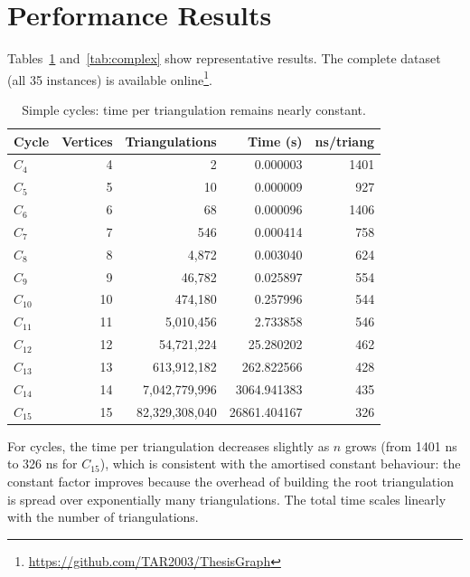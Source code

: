 \section{Performance Results}
\label{sec:results}

Tables~\ref{tab:cycles} and~\ref{tab:complex} show representative results. 
The complete dataset (all 35 instances) is available online\footnote{\url{https://github.com/TAR2003/ThesisGraph}}.

\begin{table}[htbp]
    \centering
    \caption{Simple cycles: time per triangulation remains nearly constant.}
    \label{tab:cycles}
    \begin{tabular}{|l|r|r|r|r|}
        \hline
        \textbf{Cycle} & \textbf{Vertices} & \textbf{Triangulations} & \textbf{Time (s)} & \textbf{ns/triang} \\
        \hline
        \(C_4\) & 4 & 2 & 0.000003 & 1401 \\
        \(C_5\) & 5 & 10 & 0.000009 & 927 \\
        \(C_6\) & 6 & 68 & 0.000096 & 1406 \\
        \(C_7\) & 7 & 546 & 0.000414 & 758 \\
        \(C_8\) & 8 & 4,872 & 0.003040 & 624 \\
        \(C_9\) & 9 & 46,782 & 0.025897 & 554 \\
        \(C_{10}\) & 10 & 474,180 & 0.257996 & 544 \\
        \(C_{11}\) & 11 & 5,010,456 & 2.733858 & 546 \\
        \(C_{12}\) & 12 & 54,721,224 & 25.280202 & 462 \\
        \(C_{13}\) & 13 & 613,912,182 & 262.822566 & 428 \\
        \(C_{14}\) & 14 & 7,042,779,996 & 3064.941383 & 435 \\
        \(C_{15}\) & 15 & 82,329,308,040 & 26861.404167 & 326 \\
        \hline
    \end{tabular}
\end{table}

For cycles, the time per triangulation decreases slightly as \(n\) grows (from 1401 ns to 326 ns for \(C_{15}\)), which is consistent with the amortised constant behaviour: the constant factor improves because the overhead of building the root triangulation is spread over exponentially many triangulations. 
The total time scales linearly with the number of triangulations.

